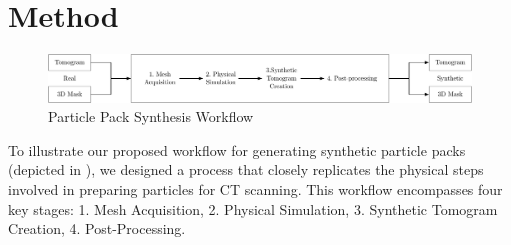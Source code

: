 \documentclass[preprint,12pt]{elsarticle}
\begin{document}
\section{Method}\label{sec:method}
\begin{figure}
    \includegraphics[width=\textwidth]{figures/pdf/synthesis-workflow.pdf}
    \caption{Particle Pack Synthesis Workflow}
    \label{fig:workflow}
\end{figure}
To illustrate our proposed workflow for generating synthetic particle packs (depicted in ), we designed a process that closely replicates the physical steps involved in preparing particles for CT scanning. This workflow encompasses four key stages:
1. Mesh Acquisition, %
2. Physical Simulation, %
3. Synthetic Tomogram Creation, %
4. Post-Processing.%

\end{document}
